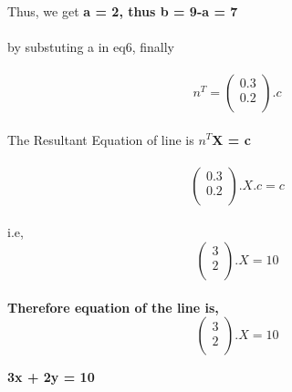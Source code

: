 \documentclass[journal,12pt,twocolumn]{IEEEtran}
\begin{document}
  \\
  Thus, we get \textbf{a = 2, thus b = 9-a = 7}\\
  \\
  by substuting a in eq6, finally\\
  \\
   \begin{equation}
   n^T = 
  \begin{pmatrix}
  0.3\\
  0.2\\
 \end{pmatrix}%
 .c
 \end{equation}
  \\
The Resultant Equation of line is \textbf{$n^{T}$X = c} \\
\\
 \begin{equation}
  \begin{pmatrix}
  0.3\\
  0.2\\
 \end{pmatrix}%
 .X.c = c
 \end{equation}
  \\
i.e,    \\
\begin{equation}
  \begin{pmatrix}
  3\\
  2\\
 \end{pmatrix}%
 . X = 10
 \end{equation}
\\
\textbf{
Therefore equation of the line is, \\
\begin{equation}
  \begin{pmatrix}
  3\\
  2\\
 \end{pmatrix}%
 . X = 10
 \end{equation}}
\begin{center}
    \textbf{3x + 2y = 10}
\end{center}
\end{document}
